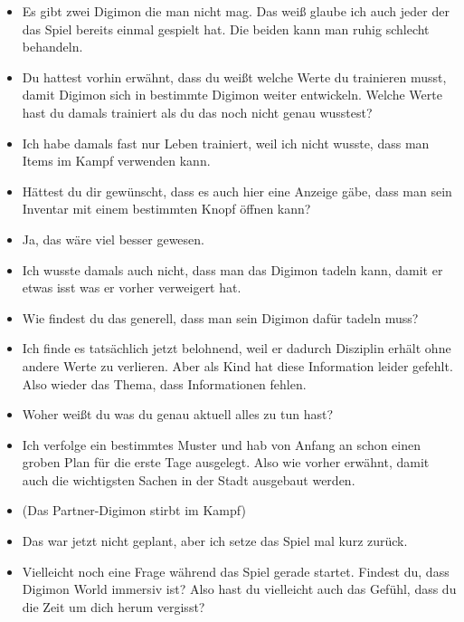 {\begin{itemize}[]
    \item {} Es gibt zwei Digimon die man nicht mag. Das weiß glaube ich auch jeder der das Spiel bereits einmal gespielt hat. Die beiden kann man ruhig schlecht behandeln.
    \item {} Du hattest vorhin erwähnt, dass du weißt welche Werte du trainieren musst, damit Digimon sich in bestimmte Digimon weiter entwickeln. Welche Werte hast du damals trainiert als du das noch nicht genau wusstest?
    \item {} Ich habe damals fast nur Leben trainiert, weil ich nicht wusste, dass man Items im Kampf verwenden kann. 
    \item {} Hättest du dir gewünscht, dass es auch hier eine Anzeige gäbe, dass man sein Inventar mit einem bestimmten Knopf öffnen kann?
    \item {} Ja, das wäre viel besser gewesen. 
    \item {} Ich wusste damals auch nicht, dass man das Digimon tadeln kann, damit er etwas isst was er vorher verweigert hat. 
    \item {} Wie findest du das generell, dass man sein Digimon dafür tadeln muss?
    \item {} Ich finde es tatsächlich jetzt belohnend, weil er dadurch Disziplin erhält ohne andere Werte zu verlieren. Aber als Kind hat diese Information leider gefehlt. Also wieder das Thema, dass Informationen fehlen. 
    \item {} Woher weißt du was du genau aktuell alles zu tun hast? 
    \item {} Ich verfolge ein bestimmtes Muster und hab von Anfang an schon einen groben Plan für die erste Tage ausgelegt. Also wie vorher erwähnt, damit auch die wichtigsten Sachen in der Stadt ausgebaut werden. 
    \item {} (Das Partner-Digimon stirbt im Kampf)
    \item {} Das war jetzt nicht geplant, aber ich setze das Spiel mal kurz zurück.
    \item {} Vielleicht noch eine Frage während das Spiel gerade startet. Findest du, dass Digimon World immersiv ist? Also hast du vielleicht auch das Gefühl, dass du die Zeit um dich herum vergisst?

\end{itemize}}
